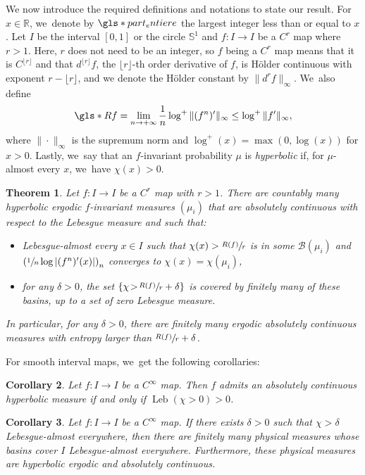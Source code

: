 \documentclass[11pt]{article}
\DeclareMathOperator{\Leb}{Leb}
\let\rC C
\newtheorem{thmtitle}{Theorem}
\newtheorem{cortitle}[thmtitle]{Corollary}
\theoremstyle{definition}
\newcommand{\bbR}{{\mathbb{R}}}
\newcommand{\bbS}{{\mathbb{S}}}
\begin{document}
We now introduce the required definitions and notations to state our result.
For $x \in \bbR$, we~denote by $\gls*{part_entiere}$ the largest integer less than or equal to $x$.
Let $I$ be the interval $[0, 1]$ or the circle $\bbS^1$ and $f : I \to I$ be a $\rC^r$ map where $r > 1$. Here, $r$ does not need to be an integer, so $f$ being a $\rC^r$ map means that it is $\rC^{\lfloor r \rfloor}$ and that $d^{\lfloor r \rfloor} f$, the $\lfloor r \rfloor$-th order derivative of $f$, is Hölder continuous with exponent $r - \lfloor r \rfloor$, and we denote the Hölder constant by $\| d^r f \|_{\infty}$. We~also define
\[
\gls*{Rf} = \lim_{n \to +\infty} \frac{1}{n} \log^+ \|(f^n)'\|_{\infty} \leq \log^+ \| f' \|_{\infty},
\]
where $\| \cdot \|_{\infty}$ is the supremum norm and $\log^+(x) =\max(0, \log(x))$ for $x > 0$.
Lastly, we~say that an $f$\nobreakdash-invariant probability $\mu$ is \textit{hyperbolic} if, for $\mu$-almost every $x$, we~have $\chi(x) > 0$.

\begin{thmtitle}
\label{thm:thm}
Let $f : I \to I$ be a $\rC^r$ map with $r > 1$.
There are countably many hyperbolic ergodic $f$\nobreakdash-invariant measures $(\mu_i)$ that are absolutely continuous with respect to the Lebesgue measure and such that:
\begin{itemize}
\item
Lebesgue-almost every $x \in I$ such that $\chi(x) > \sfrac{R(f)}{r}$ is in some $\mathcal{B}(\mu_i)$ and $\left (\sfrac{1}{n} \log |(f^n)'(x)| \right)_n$ converges to $\chi(x) = \chi(\mu_i)$,

\item
for any $\delta \!>\! 0$, the set $\left \{ \chi \!>\! \sfrac{R(f)}{r} + \delta \right \}$ is covered by finitely many of these basins, up to a set of zero Lebesgue measure.
\end{itemize}
In particular, for any $\delta > 0$, there are finitely many ergodic absolutely continuous measures with entropy larger than $\sfrac{R(f)}{r} + \delta$.
\end{thmtitle}

For smooth interval maps, we~get the following corollaries:

\begin{cortitle}
\label{cor:title}
Let $f : I \to I$ be a $\rC^{\infty}$ map.
Then $f$ admits an absolutely continuous hyperbolic measure if and only if $\Leb(\chi > 0) > 0$.
\end{cortitle}

\begin{cortitle}
\label{cor:title2}
Let $f : I \to I$ be a $\rC^{\infty}$ map. If there exists $\delta > 0$ such that $\chi > \delta$ Lebesgue-almost everywhere, then there are finitely many physical measures whose basins cover $I$ Lebesgue-almost everywhere.
Furthermore, these physical measures are hyperbolic ergodic and absolutely continuous.
\end{cortitle}
\end{document}
